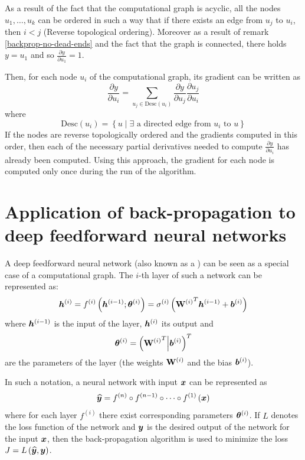 \begin{example}
As a result of the fact that the computational graph is acyclic, all the nodes \( u_1, \dots, u_k \) can be ordered in such a way that if there exists an edge from \( u_j \) to \( u_i \), then \( i < j \) (Reverse topological ordering). Moreover as a result of remark \ref{backprop-no-dead-ends} and the fact that the graph is connected, there holds \( y = u_1 \) and so \( \frac{\partial y}{\partial u_1} = 1 \).

Then, for each node \( u_i \) of the computational graph, its gradient can be written as
\[ \frac{\partial y}{\partial u_i} = \sum_{u_j \in \mathrm{Desc} \left( u_i \right)} \frac{\partial y}{\partial u_j} \frac{\partial u_j}{\partial u_i} \]
where
\[ \mathrm{Desc} \left( u_i \right) = \left\{ u \middle| \exists \text{ a directed edge from } u_i \text{ to } u \right\} \]
If the nodes are reverse topologically ordered and the gradients computed in this order, then each of the necessary partial derivatives needed to compute \( \frac{\partial y}{\partial u_i} \) has already been computed. Using this approach, the gradient for each node is computed only once during the run of the algorithm. 

\section{Application of back-propagation to deep feedforward neural networks}\label{backprop_application}

A deep feedforward neural network (also known as a ) can be seen as a special case of a computational graph. The \( i \)-th layer of such a network can be represented as:
\[ \bm h^{(i)} = f^{(i)} \left( \bm{h}^{(i - 1)} ; \bm{\theta}^{(i)} \right) = \sigma^{(i)} \left( {\mathbf{W}^{(i)}}^T \bm h^{(i - 1)} + \bm{b}^{(i)} \right) \]
where \( \bm{h}^{(i - 1)} \) is the input of the layer, \( \bm{h}^{(i)} \) its output and
\[ \bm{\theta}^{(i)} = \left( {\mathbf{W}^{(i)}}^T \middle| \bm{b}^{(i)} \right)^T \]
are the parameters of the layer (the weights \( \mathbf{W}^{(i)} \) and the bias \( \bm{b}^{(i)} \)).

In such a notation, a neural network with input \( \bm{x} \) can be represented as
\[ \widehat{\bm{y}} = f^{(n)} \circ f^{(n - 1)} \circ \dots \circ f^{(1)} \left( \bm{x} \right) \]
where for each layer \( f^{(i)} \) there exist corresponding parameters \( \bm{\theta}^{(i)} \). If \( L \) denotes the loss function of the network and \( \bm{y} \) is the desired output of the network for the input \( \bm{x} \), then the back-propagation algorithm is used to minimize the loss \( J = L \left( \widehat{\bm{y}}, \bm{y} \right) \).


\end{example}
